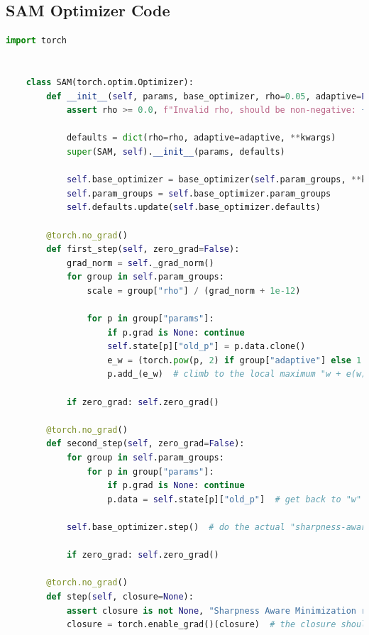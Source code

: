 \documentclass[twocolumn]{article}
\begin{document}
\subsection{SAM Optimizer Code}

\begin{lstlisting}[language=Python, caption=SAM Optimizer Code]
    import torch


    class SAM(torch.optim.Optimizer):
        def __init__(self, params, base_optimizer, rho=0.05, adaptive=False, **kwargs):
            assert rho >= 0.0, f"Invalid rho, should be non-negative: {rho}"
    
            defaults = dict(rho=rho, adaptive=adaptive, **kwargs)
            super(SAM, self).__init__(params, defaults)
    
            self.base_optimizer = base_optimizer(self.param_groups, **kwargs)
            self.param_groups = self.base_optimizer.param_groups
            self.defaults.update(self.base_optimizer.defaults)
    
        @torch.no_grad()
        def first_step(self, zero_grad=False):
            grad_norm = self._grad_norm()
            for group in self.param_groups:
                scale = group["rho"] / (grad_norm + 1e-12)
    
                for p in group["params"]:
                    if p.grad is None: continue
                    self.state[p]["old_p"] = p.data.clone()
                    e_w = (torch.pow(p, 2) if group["adaptive"] else 1.0) * p.grad * scale.to(p)
                    p.add_(e_w)  # climb to the local maximum "w + e(w)"
    
            if zero_grad: self.zero_grad()
    
        @torch.no_grad()
        def second_step(self, zero_grad=False):
            for group in self.param_groups:
                for p in group["params"]:
                    if p.grad is None: continue
                    p.data = self.state[p]["old_p"]  # get back to "w" from "w + e(w)"
    
            self.base_optimizer.step()  # do the actual "sharpness-aware" update
    
            if zero_grad: self.zero_grad()
    
        @torch.no_grad()
        def step(self, closure=None):
            assert closure is not None, "Sharpness Aware Minimization requires closure, but it was not provided"
            closure = torch.enable_grad()(closure)  # the closure should do a full forward-backward pass
    

\end{lstlisting}
\end{document}
